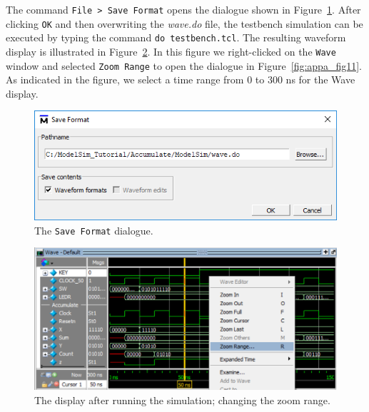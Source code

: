 \documentclass[11pt, twoside, pdftex]{article}
\begin{document}
\noindent
The command \texttt{File > Save Format} opens the dialogue shown in Figure~\ref{fig:appa_fig9}.
After clicking \texttt{OK} and then overwriting the {\it wave.do} file, the testbench 
simulation can be executed by typing the command \texttt{do testbench.tcl}. The resulting
waveform display is illustrated in Figure~\ref{fig:appa_fig10}. In this figure we
right-clicked on the \texttt{Wave} window and selected \texttt{Zoom Range} to open the
dialogue in Figure~\ref{fig:appa_fig11}. As indicated in the figure, we select a time range 
from 0 to 300 ns for the Wave display.

\begin{figure}[h!]
	\begin{center}
		\includegraphics[scale=0.8]{figures/appa_fig9.png}
	\end{center}
	\caption{The \texttt{Save Format} dialogue.}
	\label{fig:appa_fig9}
\end{figure}

\begin{figure}[h!]
	\begin{center}
		\includegraphics[scale=0.8]{figures/appa_fig10.png}
	\end{center}
		  \caption{The display after running the simulation; changing the zoom range.}
	\label{fig:appa_fig10}
\end{figure}
\end{document}
